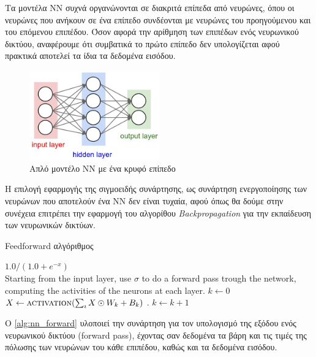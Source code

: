 Τα μοντέλα ΝΝ συχνά οργανώνονται σε διακριτά επίπεδα από νευρώνες, όπου οι
νευρώνες που ανήκουν σε ένα επίπεδο συνδέονται με νευρώνες του
προηγούμενου και του επόμενου επιπέδου. Όσον αφορά την αρίθμηση
των επιπέδων ενός νευρωνικού δικτύου, αναφέρουμε ότι συμβατικά το πρώτο επίπεδο
δεν υπολογίζεται αφού πρακτικά αποτελεί τα ίδια τα δεδομένα εισόδου.

\begin{figure}[!ht]
  \centering
  \includegraphics[width=0.5\textwidth]{./images/chapter3/simple_nn.jpg}
  \caption[Απλό μοντέλο NN με ένα κρυφό επίπεδο]{Απλό μοντέλο NN με ένα κρυφό επίπεδο}
  \label{fig:simple_nn}
\end{figure}

Η επιλογή εφαρμογής της σιγμοειδής συνάρτησης, ως συνάρτηση ενεργοποίησης των
νευρώνων που αποτελούν ένα ΝΝ δεν είναι τυχαία, αφού όπως θα δούμε στην
συνέχεια επιτρέπει την εφαρμογή του αλγορίθου \emph{Backpropagation} για την
εκπαίδευση των νευρωνικών δικτύων.

\begin{algorithm}[!htp]
  \caption{Feedforward αλγόριθμος}
  \label{alg:nn_forward}
  \begin{algorithmic}[1]
      \State \Return $1.0 / (1.0 + e^{-x})$
    \EndFunction \\
      \State Starting from the input layer, use $\sigma$ to do
         a forward pass trough the network, computing the activities of the
        neurons at each layer.
      \State $k \gets 0$
      \State $X \gets \Call{activation}{\sum_{\imath} X \odot W_{k} + B_{k}}$  .
        \State $k \gets k+1$
      \EndWhile
    \EndProcedure
  \end{algorithmic}
\end{algorithm}

O \autoref{alg:nn_forward} υλοποιεί την συνάρτηση για τον υπολογισμό της εξόδου
ενός νευρωνικού δικτύου (forward pass), έχοντας σαν δεδομένα τα βάρη και τις τιμές της πόλωσης
των νευρώνων του κάθε επιπέδου, καθώς και τα δεδομένα εισόδου.


